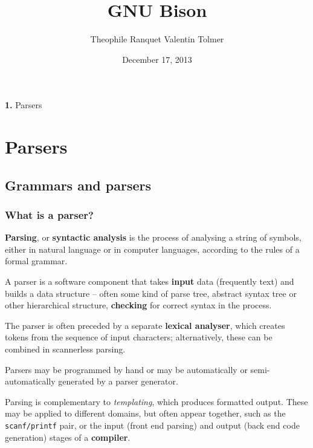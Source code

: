 \documentclass{beamer}
\begin{document}
\title{GNU Bison}
\author{Theophile Ranquet
Valentin Tolmer}

\date{December 17, 2013}

\begin{frame}[plain]
  \titlepage
\end{frame}

\begingroup
{}
\begin{frame}
    \begin{center}
        \vspace{1cm}
        {\Huge\color{black} \textbf{1.} { Parsers}}
    \end{center}
\end{frame}
\endgroup

\section{Parsers}

\subsection{Grammars and parsers}

\begin{frame}
  \frametitle{What is a parser?}
  \textbf{Parsing}, or \textbf{syntactic analysis} is the process of analysing
  a string of symbols, either in natural language or in computer languages,
  according to the rules of a formal grammar.

  \vfill

  A parser is a software component that takes \textbf{input} data (frequently
  text) and builds a data structure – often some kind of parse tree, abstract
  syntax tree or other hierarchical structure, \textbf{checking} for correct
  syntax in the process.

\end{frame}
\begin{frame}
  The parser is often preceded by a separate \textbf{lexical analyser}, which
  creates tokens from the sequence of input characters; alternatively, these
  can be combined in scannerless parsing.

  \vfill

  Parsers may be programmed by hand or may be automatically or
  semi-automatically generated by a parser generator.

  \vfill

  Parsing is complementary to \textit{templating}, which produces formatted output.
  These may be applied to different domains, but often appear together, such as
  the \texttt{scanf/printf} pair, or the input (front end parsing) and output
  (back end code generation) stages of a \textbf{compiler}.
\end{frame}
\end{document}

